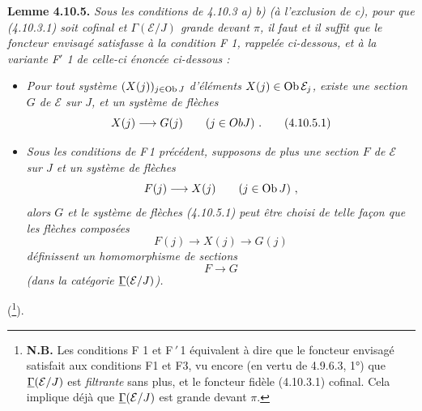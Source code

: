 \textbf{Lemme 4.10.5.} \textit{Sous les conditions de 4.10.3 a) b) (à l'exclusion de c), pour que (4.10.3.1) soit cofinal et $\Gamma(\mathcal{E}/J)$ grande devant $\pi$, il faut et il suffit que le foncteur envisagé satisfasse à la condition F 1, rappelée ci-dessous, et à la variante F$'$ 1 de celle-ci énoncée ci-dessous :}
\begin{itemize}[leftmargin=3em]
\item[F\,1)] {\itshape Pour tout système $(X(j))_{j\in\operatorname{Ob} J}$ d'éléments $X(j)\in\operatorname{Ob}\mathcal{E}_j$, existe une \textup{section} $G$ de $\mathcal{E}$ sur $J$, et un système de flèches
\[
X(j) \longrightarrow G(j) \qquad (j\in ObJ)\ . \tag*{\textup{(4.10.5.1)}}
\]}
\item[F$'$1)] {\itshape Sous les conditions de \textup{F\,1} précédent, supposons de plus une section $F$ de $\mathcal{E}$ sur $J$  et un système de flèches
\[
F(j) \longrightarrow X(j) \qquad (j\in\operatorname{Ob} J)\ ,
\]
alors $G$ et le système de flèches (4.10.5.1) peut être choisi de telle façon que les flèches composées
\[
F(j) \longrightarrow X(j) \longrightarrow G(j)
\]
définissent un homomorphisme de sections
\[
F \longrightarrow G
\]
(dans la catégorie $\underline{\Gamma}(\mathcal{E}/J)$).}
\end{itemize}
(\footnote[106]{\textbf{N.B.} Les conditions F 1 et F$\,'$\,1 équivalent à dire que le foncteur envisagé satisfait aux conditions F1 et F3, vu encore (en vertu de 4.9.6.3, 1°) que $\underline{\Gamma}(\mathcal{E}/J)$ est \textit{filtrante} sans plus, et le foncteur fidèle (4.10.3.1) cofinal. Cela implique déjà que $\underline{\Gamma}(\mathcal{E}/J)$ est grande devant $\pi$.}).

